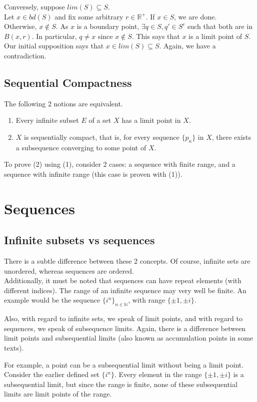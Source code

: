 \documentclass{article}
\begin{document}
Conversely, suppose $lim(S)\subseteq S$.\\
Let $x\in bd(S)$ and fix some arbitrary $r\in \mathbb{R}^+$. If $x\in S$, we are done.\\
Otherwise, $x\not \in S$. As $x$ is a boundary point, $\exists q\in S, q' \in S^c$ such that both are in $B(x,r)$. In particular, $q\neq x$ since $x\not \in S$. This says that $x$ is a limit point of $S$.\\
Our initial supposition says that $x\in lim(S)\subseteq S$. Again, we have a contradiction.  

\subsection{Sequential Compactness}
The following 2 notions are equivalent.
\begin{enumerate}
	\item Every infinite subset $E$ of a set $X$ has a limit point in $X$.
	\item $X$ is sequentially compact, that is, for every sequence $\{p_n\}$ in $X$, there exists a subsequence converging to some point of $X$.
\end{enumerate}

To prove (2) using (1), consider 2 cases: a sequence with finite range, and a sequence with infinite range (this case is proven with (1)).

\section{Sequences}
\subsection{Infinite subsets vs sequences}
There is a subtle difference between these 2 concepts. Of course, infinite sets are unordered, whereas sequences are ordered. \\
Additionally, it must be noted that sequences can have repeat elements (with different indices). The range of an infinite sequence may very well be finite. An example would be the sequence $\{i^n\}_{n\in \mathbb{N}}$, with range $\{\pm 1, \pm i\}$.

Also, with regard to infinite sets, we speak of limit points, and with regard to sequences, we speak of subsequence limits. Again, there is a difference between limit points and subsequential limits (also known as accumulation points in some texts).

For example, a point can be a subsequential limit without being a limit point. Consider the earlier defined set $\{i^n\}$. Every element in the range $\{\pm 1, \pm i\}$ is a subsequential limit, but since the range is finite, none of these subsequential limits are limit points of the range.
\end{document}
